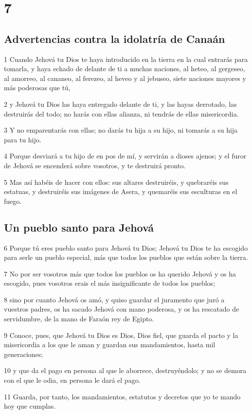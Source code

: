 \chapter{7}

\section{Advertencias contra la idolatría de Canaán }

\par 1 Cuando Jehová tu Dios te haya introducido en la tierra en la cual entrarás para tomarla, y haya echado de delante de ti a muchas naciones, al heteo, al gergeseo, al amorreo, al cananeo, al ferezeo, al heveo y al jebuseo, siete naciones mayores y más poderosas que tú,
\par 2 y Jehová tu Dios las haya entregado delante de ti, y las hayas derrotado, las destruirás del todo; no harás con ellas alianza, ni tendrás de ellas misericordia.
\par 3 Y no emparentarás con ellas; no darás tu hija a su hijo, ni tomarás a su hija para tu hijo.
\par 4 Porque desviará a tu hijo de en pos de mí, y servirán a dioses ajenos; y el furor de Jehová se encenderá sobre vosotros, y te destruirá pronto.
\par 5 Mas así habéis de hacer con ellos: sus altares destruiréis, y quebraréis sus estatuas, y destruiréis sus imágenes de Asera, y quemaréis sus esculturas en el fuego.

\section{Un pueblo santo para Jehová}

\par 6 Porque tú eres pueblo santo para Jehová tu Dios; Jehová tu Dios te ha escogido para serle un pueblo especial, más que todos los pueblos que están sobre la tierra.
\par 7 No por ser vosotros más que todos los pueblos os ha querido Jehová y os ha escogido, pues vosotros erais el más insignificante de todos los pueblos;
\par 8 sino por cuanto Jehová os amó, y quiso guardar el juramento que juró a vuestros padres, os ha sacado Jehová con mano poderosa, y os ha rescatado de servidumbre, de la mano de Faraón rey de Egipto.
\par 9 Conoce, pues, que Jehová tu Dios es Dios, Dios fiel, que guarda el pacto y la misericordia a los que le aman y guardan sus mandamientos, hasta mil generaciones;
\par 10 y que da el pago en persona al que le aborrece, destruyéndolo; y no se demora con el que le odia, en persona le dará el pago.
\par 11 Guarda, por tanto, los mandamientos, estatutos y decretos que yo te mando hoy que cumplas.

